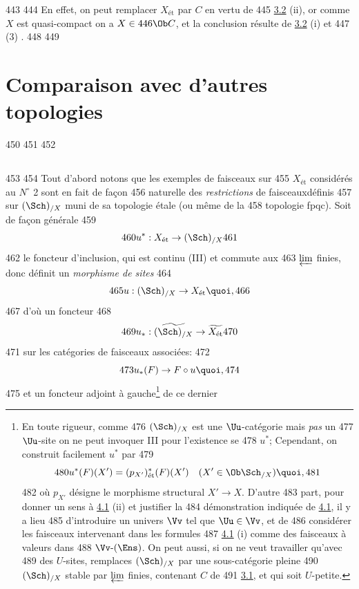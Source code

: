    443	
   444	En effet, on peut remplacer $X_{\text{ét}}$ par $C$ en vertu de
   445	\hyperref[VII.cor3.2]{3.2} (ii), or comme $X$ est quasi-compact on a $X \in
   446	\Ob C$, et la conclusion résulte de \hyperref[VII.cor3.2]{3.2} (i) et
   447	 (3) .
   448	
   449	\section{Comparaison avec d'autres topologies}
   450	
   451	\setcounter{subsection}{-1}
   452	\subsection{}
   453	
   454	Tout d'abord notons que les exemples de faisceaux sur
   455	$X_{\text{ét}}$ considérés au $N^{\circ}$ 2 sont en fait de façon
   456	naturelle des \emph{restrictions} de faisceaux\pageoriginale définis
   457	sur $(\Sch)_{/X}$ muni de sa topologie étale (ou même de la
   458	topologie fpqc). Soit de façon générale
   459	$$
   460	u^{\ast} : X_{\text{ét}} \to (\Sch)_{/X}
   461	$$
   462	le foncteur d'inclusion, qui est continu (III) et commute aux
   463	$\varprojlim$ finies, donc définit un \emph{morphisme de sites}
   464	$$
   465	u : (\Sch)_{/X} \to X_{\text{ét}}{\quoi},
   466	$$
   467	d'où un foncteur
   468	$$
   469	u_{\ast} : \widetilde{(\Sch)_{/X}} \to \widetilde{X_{\text{ét}}}
   470	$$
   471	sur les catégories de faisceaux associées:
   472	$$
   473	u_{\ast} (F) \to F \circ u{\quoi},
   474	$$
   475	et un foncteur adjoint à gauche\footnote{En toute rigueur, comme
   476	$(\Sch)_{/X}$ est une $\Uu$-catégorie mais \emph{pas} un
   477	$\Uu$-site on ne peut invoquer III pour l'existence se
   478	$u^{\ast}$; Cependant, on construit facilement $u^{\ast}$ par
   479	$$
   480	u^{\ast} (F) (X') = (p_{X'})^{\ast}_{\text{ét}} (F) (X')\quad (X'\in \Ob \Sch_{/X}){\quoi},
   481	$$
   482	où $p_{X'}$ désigne le morphisme structural $X'\to X$. D'autre
   483	part, pour donner un sens à \hyperref[VII.prop4.1]{4.1} (ii) et justifier la
   484	démonstration indiquée de \hyperref[VII.prop4.1]{4.1}, il y a lieu
   485	d'introduire un univers $\Vv$ tel que $\Uu \in \Vv$, et de
   486	considérer les faisceaux intervenant dans les formules
   487	\hyperref[VII.prop4.1]{4.1} (i) comme des faisceaux à valeurs dans
   488	$\Vv\text{-}(\Ens)$. On peut aussi, si on ne veut travailler qu'avec
   489	des $U$-sites, remplaces $(\Sch)_{/X}$ par une sous-catégorie pleine
   490	$(\Sch)_{/X}$ stable par $\varprojlim$ finies, contenant $C$ de
   491	\hyperref[VII.prop3.1]{3.1}, et qui soit $U$-petite.} de ce dernier
